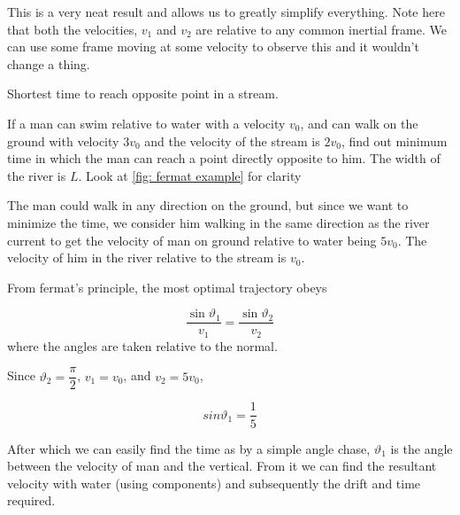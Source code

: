 This is a very neat result and allows us to greatly simplify everything. Note 
here that both the velocities, \(v_1\) and \(v_2\) are relative to any common inertial
frame. We can use some frame moving at some velocity to observe this and it wouldn't change 
a thing. 

\begin{marginfigure}
    \centering
    \caption{Shortest time to reach opposite point in a stream.}
    \label{fig: fermat example}
\end{marginfigure}

\begin{example}
    If a man can swim relative to water with a velocity \(v_0\), and can walk on the ground 
    with velocity \(3v_0\) and the velocity of the stream is \(2v_0\), find out minimum time 
    in which the man can reach a point directly opposite to him. The width of the river is \(L\).
    Look at \cref{fig: fermat example} for clarity

    \begin{soln}
        The man could walk in any direction on the ground, but since we want to minimize 
        the time, we consider him walking in the same direction as the river current to get 
        the velocity of man on ground relative to water being \(5v_0\). The velocity 
        of him in the river relative to the stream is \(v_0\). 

        From fermat's principle, the most optimal trajectory obeys 
        
        \begin{equation*}
            \frac{\sin\vartheta_1}{v_1} = \frac{\sin\vartheta_2}{v_2}
        \end{equation*}
        where the angles are taken relative to the normal. 
        
        Since \(\vartheta_2 = \dfrac{\pi}{2}\), \(v_1 = v_0\), and \(v_2 = 5v_0\),

        \begin{equation*}
            sin\vartheta_1 = \frac{1}{5}
        \end{equation*}

        After which we can easily find the time as by a simple angle chase, \(\vartheta_1\) is 
        the angle between the velocity of man and the vertical. From it we 
        can find the resultant velocity with water (using components) 
        and subsequently the drift and time required.
    \end{soln}
\end{example}

